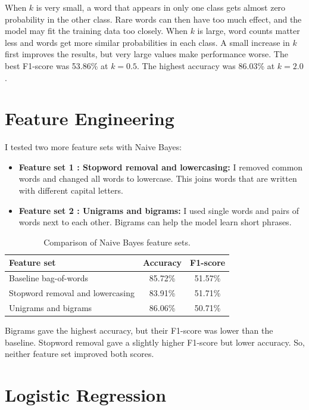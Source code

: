 \documentclass[a4paper,9pt]{article}
\begin{document}
When \(k\) is very small, a word that appears in only one class gets
almost zero probability in the other class. Rare words can then have
too much effect, and the model may fit the training data too closely.
When \(k\) is large, word counts matter less and words get more similar
probabilities in each class. A small increase in \(k\) first improves
the results, but very large values make performance worse. The best
F1-score was 53.86\% at \(k=0.5\). The highest accuracy was 86.03\%
at \(k=2.0\).

\section{Feature Engineering}

I tested two more feature sets with Naive Bayes:

\begin{itemize}
    \item \textbf{Feature set 1 : Stopword removal and lowercasing:}
    I removed common words and changed all words to lowercase. This
    joins words that are written with different capital letters.

    \item \textbf{Feature set 2 : Unigrams and bigrams:}
    I used single words and pairs of words next to each other.
    Bigrams can help the model learn short phrases.
\end{itemize}

\begin{table}[H]
\centering
\small
\begin{tabular}{lcc}
\toprule
\textbf{Feature set} & \textbf{Accuracy} & \textbf{F1-score} \\
\midrule
Baseline bag-of-words & 85.72\% & 51.57\% \\
Stopword removal and lowercasing & 83.91\% & 51.71\% \\
Unigrams and bigrams & 86.06\% & 50.71\% \\
\bottomrule
\end{tabular}
\caption{Comparison of Naive Bayes feature sets.}
\end{table}

Bigrams gave the highest accuracy, but their F1-score was lower than
the baseline. Stopword removal gave a slightly higher F1-score but
lower accuracy. So, neither feature set improved both scores.

\section{Logistic Regression}
\end{document}
